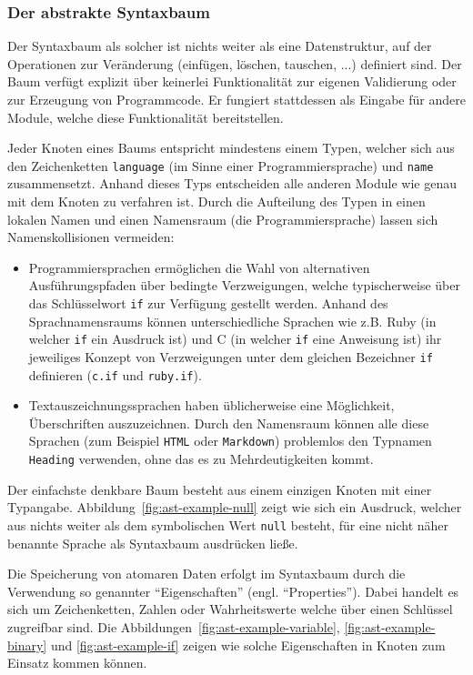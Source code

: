 \documentclass[paper=a4,fontsize=11pt,parskip=half]{scrartcl}
\begin{document}
\subsubsection{Der abstrakte Syntaxbaum}

Der Syntaxbaum als solcher ist nichts weiter als eine Datenstruktur, auf der Operationen zur Veränderung (einfügen, löschen, tauschen, ...) definiert sind. Der Baum verfügt explizit über keinerlei Funktionalität zur eigenen Validierung oder zur Erzeugung von Programmcode. Er fungiert stattdessen als Eingabe für andere Module, welche diese Funktionalität bereitstellen.

Jeder Knoten eines Baums entspricht mindestens einem Typen, welcher sich aus den Zeichenketten \texttt{language} (im Sinne einer Programmiersprache) und \texttt{name} zusammensetzt. Anhand dieses Typs entscheiden alle anderen Module wie genau mit dem Knoten zu verfahren ist. Durch die Aufteilung des Typen in einen lokalen Namen und einen Namensraum (die Programmiersprache) lassen sich Namenskollisionen vermeiden:

\begin{itemize}
\item Programmiersprachen ermöglichen die Wahl von alternativen Ausführungspfaden  über bedingte Verzweigungen, welche typischerweise über das Schlüsselwort \texttt{if} zur Verfügung gestellt werden. Anhand des Sprachnamensraums können unterschiedliche Sprachen wie z.B. Ruby (in welcher \texttt{if} ein Ausdruck ist) und C (in welcher \texttt{if} eine Anweisung ist) ihr jeweiliges Konzept von Verzweigungen unter dem gleichen Bezeichner \texttt{if} definieren (\texttt{c.if} und \texttt{ruby.if}).
\item Textauszeichnungssprachen haben üblicherweise eine Möglichkeit, Überschriften auszuzeichnen. Durch den Namensraum können alle diese Sprachen (zum Beispiel \texttt{HTML} oder \texttt{Markdown}) problemlos den Typnamen \texttt{Heading} verwenden, ohne das es zu Mehrdeutigkeiten kommt.
\end{itemize}

Der einfachste denkbare Baum besteht aus einem einzigen Knoten mit einer Typangabe. Abbildung~\ref{fig:ast-example-null} zeigt wie sich ein Ausdruck, welcher aus nichts weiter als dem symbolischen Wert \texttt{null} besteht, für eine nicht näher benannte Sprache als Syntaxbaum ausdrücken ließe.

Die Speicherung von atomaren Daten erfolgt im Syntaxbaum durch die Verwendung so genannter \enquote{Eigenschaften} (engl. \enquote{Properties}). Dabei handelt es sich um Zeichenketten, Zahlen oder Wahrheitswerte welche über einen Schlüssel zugreifbar sind. Die Abbildungen~\ref{fig:ast-example-variable}, \ref{fig:ast-example-binary} und \ref{fig:ast-example-if} zeigen wie solche Eigenschaften in Knoten zum Einsatz kommen können.
\end{document}
